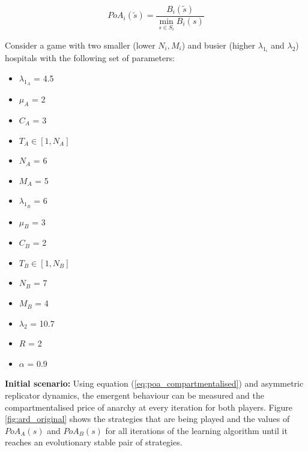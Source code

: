\begin{equation}\label{eq:poa_compartmentalised}
    PoA_{i}(\tilde{s}) = \frac{B_i(\tilde{s})}{\min_{s \in S_i} B_i(s)}
\end{equation}

Consider a game with two smaller (lower \( N_i, M_i \)) and busier (higher 
\(\lambda_{1_i} \) and \(\lambda_2\)) hospitals with the following set of 
parameters:

\begin{multicols}{3}
    \begin{itemize}        
        \item \( \lambda_{1_A} \) = 4.5
        \item \( \mu_A \) = 2
        \item \( C_A \) = 3
        \item \( T_A \in [1, N_A] \) 
        \item \( N_A \) = 6
        \item \( M_A \) = 5

        \columnbreak
        \item \( \lambda_{1_B} \) = 6
        \item \( \mu_B \) = 3
        \item \( C_B \) = 2
        \item \( T_B \in [1, N_B] \)
        \item \( N_B \) = 7
        \item \( M_B \) = 4
        
        \columnbreak
        \item \( \lambda_2 \) = 10.7
        \item \( R \) = 2
        \item \( \alpha \) = 0.9
    \end{itemize}
\end{multicols}

\textbf{Initial scenario:}
Using equation (\ref{eq:poa_compartmentalised}) and asymmetric replicator 
dynamics, the emergent behaviour can be measured and the compartmentalised price 
of anarchy at every iteration for both players.
Figure \ref{fig:ard_original} shows the strategies that are being played and 
the values of \(PoA_A(s)\) and \(PoA_B(s)\) for all iterations of the 
learning algorithm until it reaches an evolutionary stable pair of strategies.

